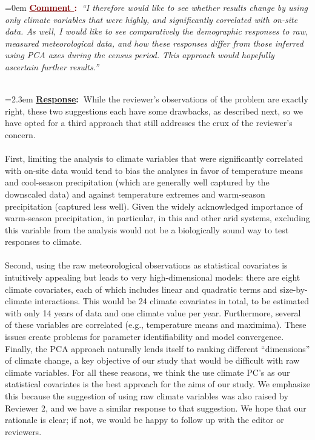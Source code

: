 \documentclass[12pt]{article}
\newcounter{cN}
\newcommand{\comment}[1]{
	\vspace{2em}
	\refstepcounter{cN} %
	\noindent \hangindent=0em \textbf{\textcolor{Maroon}{\uline{Comment \thecN}:~}}\emph{``#1''}
	}
\newcommand{\response}[1]{
	\\[0.25em]
	\hangindent=2.3em \textbf{\textcolor{NavyBlue}{\uline{Response}:~}}#1
	}
\begin{document}
\comment{I therefore would like to see whether results change by using only climate variables that were highly, and significantly correlated with on-site data. As well, I would like to see comparatively the demographic responses to raw, measured meteorological data, and how these responses differ from those inferred using PCA axes during the census period. 
This approach would hopefully ascertain further results.}
\response{While the reviewer's observations of the problem are exactly right, these two suggestions each have some drawbacks, as described next, so we have opted for a third approach that still addresses the crux of the reviewer's concern. 
\\
\\
First, limiting the analysis to climate variables that were significantly correlated with on-site data would tend to bias the analyses in favor of temperature means and cool-season precipitation (which are generally well captured by the downscaled data) and against temperature extremes and warm-season precipitation (captured less well). 
Given the widely acknowledged importance of warm-season precipitation, in particular, in this and other arid systems, excluding this variable from the analysis would not be a biologically sound way to test responses to climate. 
\\
\\
Second, using the raw meteorological observations as statistical covariates is intuitively appealing but leads to very high-dimensional models: there are eight climate covariates, each of which includes linear and quadratic terms and size-by-climate interactions. This would be 24 climate covariates in total, to be estimated with only 14 years of data and one climate value per year.
Furthermore, several of these variables are correlated (e.g., temperature means and maximima). 
These issues create problems for parameter identifiability and model convergence.
Finally, the PCA approach naturally lends itself to ranking different ``dimensions'' of climate change, a key objective of our study that would be difficult with raw climate variables. 
For all these reasons, we think the use climate PC's as our statistical covariates is the best approach for the aims of our study. 
We emphasize this because the suggestion of using raw climate variables was also raised by Reviewer 2, and we have a similar response to that suggestion. 
We hope that our rationale is clear; if not, we would be happy to follow up with the editor or reviewers. 
\\
\\
}
\end{document}
